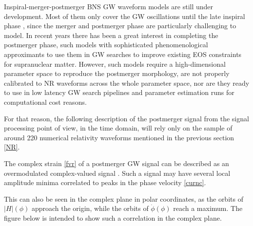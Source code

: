 Inspiral-merger-postmerger BNS GW waveform models are still under development. Most of them only cover the GW oscillations until the late inspiral phase \cite{Hinderer:2009ca,Damour:2012yf,PhysRevD.96.121501,Dietrich:2018uni}, since the merger and postmerger phase are particularly challenging to model. In recent years there has been a great interest in completing the postmerger phase, such models with sophisticated phenomenological approximants \cite{Breschi:2019srl, Tsang:2019esi, Soultanis:2021oia, https://doi.org/10.48550/arxiv.2205.09112} to use them in GW searches to improve existing EOS constraints for supranuclear matter. However, such models require a high-dimensional parameter space to reproduce the postmerger morphology, are not properly calibrated to NR waveforms across the whole parameter space, nor are they ready to use in low latency GW search pipelines and parameter estimation runs for computational cost reasons. 

For that reason, the following description of the postmerger signal from the signal processing point of view, in the time domain, will rely only on the sample of around 220 numerical relativity waveforms mentioned in the previous section \ref{NR}.


The complex strain \ref{fvr} of a postmerger GW signal can be described as an overmodulated complex-valued signal \cite{Kastaun:2016elu}. Such a signal may have several local amplitude minima correlated to peaks in the phase velocity \ref{curnc}.

This can also be seen in the complex plane in polar coordinates, as the orbits of $|H|(\phi)$ approach the origin, while the orbits of $\dot{\phi}(\phi)$ reach a maximum. The figure below is intended to show such a correlation in the complex plane.


